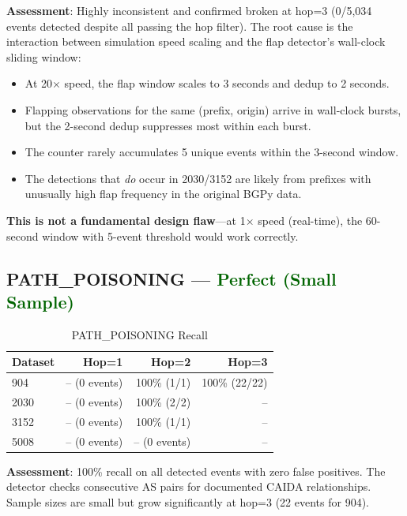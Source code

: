 \documentclass[11pt,a4paper]{article}
\begin{document}
\textbf{Assessment}: Highly inconsistent and confirmed broken at hop=3 (0/5,034
events detected despite all passing the hop filter). The root cause is the
interaction between simulation speed scaling and the flap detector's wall-clock
sliding window:

\begin{itemize}
    \item At 20$\times$ speed, the flap window scales to 3 seconds and dedup to 2 seconds.
    \item Flapping observations for the same (prefix, origin) arrive in wall-clock
          bursts, but the 2-second dedup suppresses most within each burst.
    \item The counter rarely accumulates 5 unique events within the 3-second window.
    \item The detections that \emph{do} occur in 2030/3152 are likely from prefixes
          with unusually high flap frequency in the original BGPy data.
\end{itemize}

\textbf{This is not a fundamental design flaw}---at 1$\times$ speed (real-time), the
60-second window with 5-event threshold would work correctly.

\subsection{PATH\_POISONING --- \textcolor{darkgreen}{Perfect (Small Sample)}}

\begin{table}[H]
\centering
\caption{PATH\_POISONING Recall}
\begin{tabular}{l|rrr}
\toprule
\textbf{Dataset} & \textbf{Hop=1} & \textbf{Hop=2} & \textbf{Hop=3} \\
\midrule
904   & -- (0 events) & 100\% (1/1)   & 100\% (22/22) \\
2030  & -- (0 events) & 100\% (2/2)   & -- \\
3152  & -- (0 events) & 100\% (1/1)   & -- \\
5008  & -- (0 events) & -- (0 events) & -- \\
\bottomrule
\end{tabular}
\end{table}

\textbf{Assessment}: 100\% recall on all detected events with zero false positives.
The detector checks consecutive AS pairs for documented CAIDA relationships.
Sample sizes are small but grow significantly at hop=3 (22 events for 904).
\end{document}
